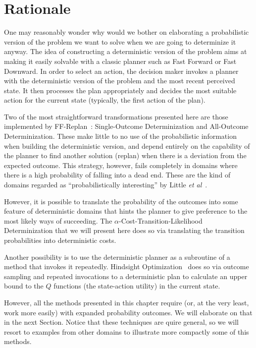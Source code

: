 \documentclass[../root.tex]{subfiles}
\begin{document}
\section{Rationale}

One may reasonably wonder why would we bother on elaborating a
probabilistic version of the problem we want to solve when
we are going to determinize it anyway. The idea of constructing
a deterministic version of the problem
aims at making it easily solvable with a classic planner such as
Fast Forward or Fast Downward. In order to select an action, the decision
maker invokes a planner with the deterministic version of the problem
and the most recent perceived state. It then processes the plan
appropriately and decides the most suitable action for the current
state (typically, the first action of the plan).

Two of the most straightforward transformations
presented here are those implemented by FF-Replan~\cite{yoon2007ffreplan}:
Single-Outcome Determinization and All-Outcome Determinization.
These make little to no use of the probabilistic information when
building the deterministic version, and depend entirely on the capability of
the planner to find another solution (replan) when there is a deviation
from the expected outcome. This strategy, however, fails completely in domains
where there
is a high probability of falling into a dead end. These are the kind of domains
regarded as ``probabilistically interesting'' by Little \emph{et al}~\cite{little2007probabilistic}.

However, it is possible to
translate the probability of the outcomes into some feature
of deterministic domains that hints the planner to give
preference to the most likely ways of succeeding.
The $\alpha$-Cost-Transition-Likelihood~\cite{kaelbling2013integrated}
Determinization that
we will present here does so via translating the transition probabilities
into deterministic costs.

Another possibility is to use the deterministic planner as a subroutine
of a method that invokes it repeatedly. Hindsight
Optimization~\cite{yoon2008probabilistic,yoon2010improving} does so
via outcome
sampling and repeated invocations to a deterministic plan to calculate
an upper bound to the $ Q $ functions (the state-action utility) in the
current state.

However, all the methods presented in this chapter require (or, at the
very least, work more easily) with expanded probability outcomes. We
will elaborate on that in the next Section. Notice that these techniques
are quire general, so we will resort to examples from other domains to
illustrate more compactly some of this methods.
\end{document}
